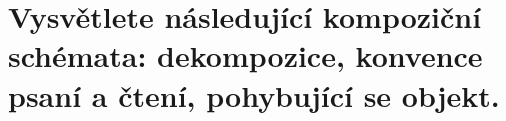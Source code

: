 \section{Vysvětlete následující kompoziční schémata: dekompozice, konvence psaní a čtení, pohybující se objekt.}